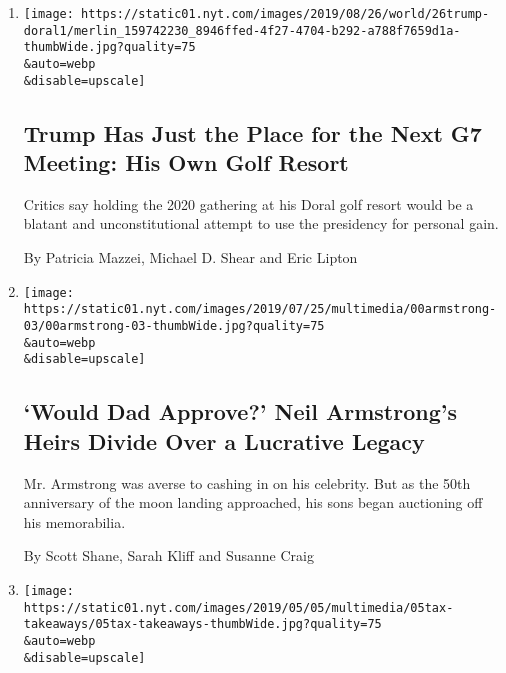 \begin{enumerate}
\def\labelenumi{\arabic{enumi}.}
\item
  \href{/2019/08/26/world/europe/trump-doral-g7.html}{}

  \texttt{[image: https://static01.nyt.com/images/2019/08/26/world/26trump-doral1/merlin\_159742230\_8946ffed-4f27-4704-b292-a788f7659d1a-thumbWide.jpg?quality=75\\\&auto=webp\\\&disable=upscale]}

  \hypertarget{trump-has-just-the-place-for-the-next-g7-meeting-his-own-golf-resort}{%
  \subsection{Trump Has Just the Place for the Next G7 Meeting: His Own
  Golf
  Resort}\label{trump-has-just-the-place-for-the-next-g7-meeting-his-own-golf-resort}}

  Critics say holding the 2020 gathering at his Doral golf resort would
  be a blatant and unconstitutional attempt to use the presidency for
  personal gain.

  By Patricia Mazzei, Michael D. Shear and Eric Lipton
\item
  \href{/2019/07/27/us/neil-armstrong-heirs.html}{}

  \texttt{[image: https://static01.nyt.com/images/2019/07/25/multimedia/00armstrong-03/00armstrong-03-thumbWide.jpg?quality=75\\\&auto=webp\\\&disable=upscale]}

  \hypertarget{would-dad-approve-neil-armstrongs-heirs-divide-over-a-lucrative-legacy}{%
  \subsection{`Would Dad Approve?' Neil Armstrong's Heirs Divide Over a
  Lucrative
  Legacy}\label{would-dad-approve-neil-armstrongs-heirs-divide-over-a-lucrative-legacy}}

  Mr. Armstrong was averse to cashing in on his celebrity. But as the
  50th anniversary of the moon landing approached, his sons began
  auctioning off his memorabilia.

  By Scott Shane, Sarah Kliff and Susanne Craig
\item
  \href{/2019/05/07/us/trump-tax-figures.html}{}

  \texttt{[image: https://static01.nyt.com/images/2019/05/05/multimedia/05tax-takeaways/05tax-takeaways-thumbWide.jpg?quality=75\\\&auto=webp\\\&disable=upscale]}

  \hypertarget{5-takeaways-from-10-years-of-trump-tax-figures}{%
}
\end{enumerate}
